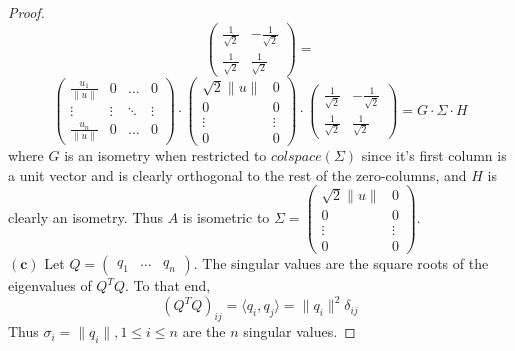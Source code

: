 \documentclass[11pt]{article}
\theoremstyle{quest}
\begin{document}
\begin{proof}
$$\begin{pmatrix}
\frac{1}{\sqrt{2}} & -\frac{1}{\sqrt{2}} \\
\frac{1}{\sqrt{2}} & \frac{1}{\sqrt{2}}
\end{pmatrix} =$$ $$\begin{pmatrix}
\frac{u_1}{\|u\|} & 0 & \ldots & 0 \\
\vdots & \vdots & \ddots & \vdots \\
\frac{u_n}{\|u\|} & 0 & \ldots & 0
\end{pmatrix} \cdot \begin{pmatrix}
\sqrt{2}\|u\| & 0 \\
0 & 0 \\
\vdots & \vdots \\
0 & 0
\end{pmatrix} \cdot \begin{pmatrix}
\frac{1}{\sqrt{2}} & -\frac{1}{\sqrt{2}} \\
\frac{1}{\sqrt{2}} & \frac{1}{\sqrt{2}}
\end{pmatrix} = G \cdot \Sigma \cdot H$$
where $G$ is an isometry when restricted to $colspace(\Sigma)$ since it's first column is a unit vector and is clearly orthogonal to the rest of the zero-columns, and $H$ is clearly an isometry. Thus $A$ is isometric to $\Sigma = \begin{pmatrix}
\sqrt{2}\|u\| & 0 \\
0 & 0 \\
\vdots & \vdots \\
0 & 0
\end{pmatrix}$.
\\$\mathbf{(c)}$ Let $Q = \begin{pmatrix}
q_1 & \ldots & q_n
\end{pmatrix} $. The singular values are the square roots of the eigenvalues of $Q^TQ$. To that end,
$$(Q^TQ)_{ij} = \langle q_i, q_j \rangle = \|q_i\|^2 \delta_{ij}$$
Thus $\sigma_i = \|q_i\|, 1 \le i \le n$ are the $n$ singular values.
\end{proof}
\end{document}
